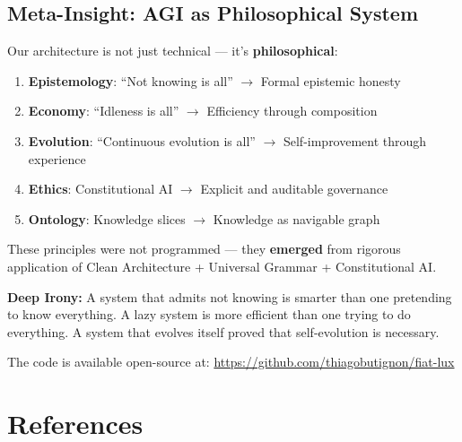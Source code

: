 \documentclass[11pt]{article}
\begin{document}
\subsection{Meta-Insight: AGI as Philosophical System}

Our architecture is not just technical --- it's \textbf{philosophical}:

\begin{enumerate}
    \item \textbf{Epistemology}: ``Not knowing is all'' $\rightarrow$ Formal epistemic honesty
    \item \textbf{Economy}: ``Idleness is all'' $\rightarrow$ Efficiency through composition
    \item \textbf{Evolution}: ``Continuous evolution is all'' $\rightarrow$ Self-improvement through experience
    \item \textbf{Ethics}: Constitutional AI $\rightarrow$ Explicit and auditable governance
    \item \textbf{Ontology}: Knowledge slices $\rightarrow$ Knowledge as navigable graph
\end{enumerate}

These principles were not programmed --- they \textbf{emerged} from rigorous application of Clean Architecture + Universal Grammar + Constitutional AI.

\textbf{Deep Irony:} A system that admits not knowing is smarter than one pretending to know everything. A lazy system is more efficient than one trying to do everything. A system that evolves itself proved that self-evolution is necessary.

The code is available open-source at:
\url{https://github.com/thiagobutignon/fiat-lux}

\section*{References}
\end{document}
